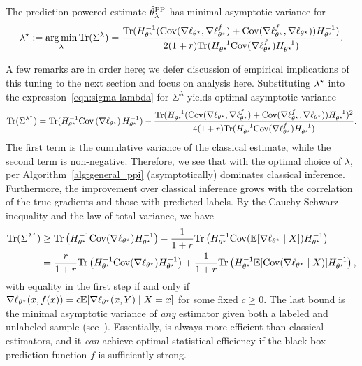 \begin{proposition}
  \label{prop:optimal-lambda}
  The prediction-powered estimate $\hat{\theta}^{\mathrm{PP}}_\lambda$ has minimal asymptotic
  variance for
  \begin{equation*}
    \lambda^\star
    := \operatorname*{arg\,min}_\lambda \mathrm{Tr}(\Sigma^\lambda)
    = \frac{\mathrm{Tr}(H_{\theta^\star}^{-1}(
      \mathrm{Cov}(\nabla \ell_{\theta^\star}, \nabla \ell_{\theta^\star}^f)
      + \mathrm{Cov}(\nabla \ell_{\theta^\star}^f, \nabla \ell_{\theta^\star}))
      H_{\theta^\star}^{-1})}{
      2(1+r) \mathrm{Tr}(H_{\theta^\star}^{-1}\mathrm{Cov}(\nabla \ell_{\theta^\star}^f) H_{\theta^\star}^{-1} )}.
  \end{equation*}
\end{proposition}

A few remarks are in order here; we defer discussion of empirical implications
of this tuning to the next section and focus on analysis
here.
Substituting $\lambda^\star$ into the
expression~\eqref{eqn:sigma-lambda} for $\Sigma^\lambda$ yields optimal
asymptotic variance
\begin{equation*}
  \mathrm{Tr}(\Sigma^{\lambda^\star})
  = \mathrm{Tr}(H_{\theta^\star}^{-1}\mathrm{Cov}\left(\nabla \ell_{\theta^\star}\right)
  H_{\theta^\star}^{-1})
  - \frac{\mathrm{Tr}(H_{\theta^\star}^{-1}(\mathrm{Cov}(\nabla \ell_{\theta^\star},
    \nabla \ell_{\theta^\star}^f ) + \mathrm{Cov}(\nabla \ell_{\theta^\star}^f, \nabla \ell_{\theta^\star} ) )H_{\theta^\star}^{-1})^2}{4(1+r) \mathrm{Tr}(H_{\theta^\star}^{-1}\mathrm{Cov}(\nabla \ell_{\theta^\star}^f) H_{\theta^\star}^{-1} ) }.
\end{equation*}
The first term is the cumulative variance of the classical estimate, while
the second term is non-negative. Therefore, we see that with the optimal
choice of $\lambda$, \ppipp per
Algorithm~\ref{alg:general_ppi} (asymptotically) dominates classical
inference. Furthermore, the improvement over classical inference grows with
the correlation of the true gradients and those with predicted labels. By the Cauchy-Schwarz inequality and the law of total variance,
we have
\begin{align*}
  \mathrm{Tr}(\Sigma^{\lambda^\star})
  & \ge \mathrm{Tr}\left(H_{\theta^\star}^{-1} \mathrm{Cov}(\nabla \ell_{\theta^\star})
  H_{\theta^\star}^{-1}\right)
  - \frac{1}{1 + r}
  \mathrm{Tr}\left(H_{\theta^\star}^{-1} \mathrm{Cov}(\mathbb{E}[\nabla \ell_{\theta^\star} \mid X])
  H_{\theta^\star}^{-1}\right) \\
  & =
  \frac{r}{1 + r}
  \mathrm{Tr}\left(H_{\theta^\star}^{-1} \mathrm{Cov}(\nabla \ell_{\theta^\star}) H_{\theta^\star}^{-1}
  \right)
  + \frac{1}{1 + r} \mathrm{Tr}\left(H_{\theta^\star}^{-1}\mathbb{E}[\mathrm{Cov}(\nabla\ell_{\theta^\star} \mid X)]
  H_{\theta^\star}^{-1}\right),
\end{align*}
with equality in the first step if and only if
$\nabla \ell_{\theta^\star}(x, f(x)) = c\mathbb{E}[\nabla \ell_{\theta^\star}(x, Y)
  \mid X = x]$ for some fixed $c \ge 0$. The last bound is
the minimal asymptotic variance of \emph{any} estimator given
both a labeled and unlabeled sample (see~\cite{AngelopoulosDuZr23w}).
Essentially, \ppipp is always more efficient than classical estimators,
and it \emph{can} achieve optimal statistical efficiency if the black-box prediction function $f$ is sufficiently strong.

